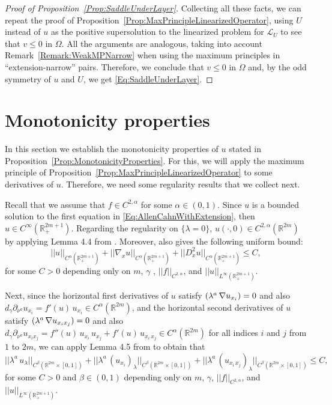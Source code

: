 \documentclass[twoside,leqno,symbols-for-thanks, draft]{rmi}
\numberwithin{equation}{section}
\theoremstyle{definition}
\newcommand{\con}[1]{\mathbb{#1}}
\newcommand{\R}{\con{R}} %
\newcommand{\s}{\gamma}
\let\div\relax
\DeclareMathOperator{\div}{div}
\begin{document}
\begin{proof}[Proof of Proposition~\ref{Prop:SaddleUnderLayer}]
	
	Collecting all these facts, we can repeat the proof of Proposition~\ref{Prop:MaxPrincipleLinearizedOperator}, using $U$ instead of $u$ as the positive supersolution to the linearized problem for $\mathscr{L}_U$ to see that $v\leq 0$ in $\Omega$. All the arguments are analogous, taking into account Remark~\ref{Remark:WeakMPNarrow} when using the maximum principles in ``extension-narrow'' pairs. Therefore, we conclude that $v\leq 0$ in $\Omega$ and, by the odd symmetry of $u$ and $U$, we get \eqref{Eq:SaddleUnderLayer}.
\end{proof}



\section{Monotonicity properties}
\label{Sec:Monotonicity}

In this section we establish the monotonicity properties of $u$ stated in Proposition~\ref{Prop:MonotonicityProperties}. For this, we will apply the maximum principle of Proposition~\ref{Prop:MaxPrincipleLinearizedOperator} to some derivatives of $u$. Therefore, we need some regularity results that we collect next. 

Recall that we assume that $f\in C^{2,\alpha}$ for some $\alpha\in(0,1)$. Since $u$ is a bounded solution to the first equation in \eqref{Eq:AllenCahnWithExtension}, then $u\in C^\infty(\R^{2m+1}_+)$. Regarding the regularity on $\{\lambda = 0\}$, $u(\cdot,0)\in C^{2,\alpha}(\R^{2m})$ by applying Lemma 4.4 from \cite{CabreSireI}. Moreover, \cite{CabreSireI} also gives the following uniform bound:
$$ 
||u||_{C^\alpha\left(\overline{\R^{2m+1}_+}\right)} + ||\nabla_x u||_{C^\alpha\left(\overline{\R^{2m+1}_+}\right)} + ||D^2_x u||_{C^\alpha\left(\overline{\R^{2m+1}_+}\right)} \leq C, 
$$
for some $C>0$ depending only on $m$, $\s$ , $||f||_{C^{2,\alpha}}$, and $||u||_{L^\infty(\R^{2m+1}_+)}$.

Next, since the horizontal first derivatives of $u$ satisfy $\div(\lambda^a \, \nabla u_{x_i}) = 0$ and also $d_\s \partial_{\nu^a}  u_{x_i} = f'(u) \,u_{x_i} \in C^\alpha(\R^{2m})$, and the  horizontal second derivatives of $u$ satisfy $\div(\lambda^a \, \nabla u_{x_i x_j}) = 0$ and also  $d_\s\partial_{\nu^a} u_{x_i x_j} = f''(u) \,u_{x_i}\,u_{x_j} + f'(u) \, u_{x_i\,x_j}\in C^\alpha(\R^{2m})$ for all indices $i$ and $j$ from $1$ to $2m$, we can apply Lemma 4.5 from \cite{CabreSireI} to obtain that
$$
||\lambda^a \, u_\lambda||_{C^\beta\left(\R^{2m}\times [0,1]\right)} + ||\lambda^a \, (u_{x_i})_\lambda||_{C^\beta\left(\R^{2m}\times [0,1]\right)}  + ||\lambda^a \, (u_{x_i\,x_j})_\lambda||_{C^\beta\left(\R^{2m}\times [0,1]\right)} \!\leq C,
$$
for some $C>0$ and $\beta\in(0,1)$ depending only on $m$, $\s$, $||f||_{C^{2,\alpha}}$, and $||u||_{L^\infty(\R^{2m+1}_+\!)}$.
\end{document}
